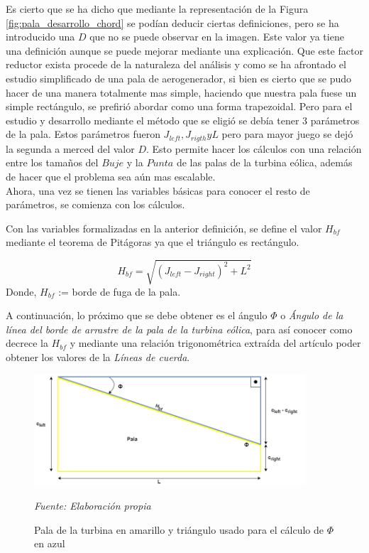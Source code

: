 Es cierto que se ha dicho que mediante la representación de la Figura \ref{fig:pala_desarrollo_chord} se podían deducir ciertas definiciones, pero se ha introducido una $D$ que no se puede observar en la imagen. Este valor ya tiene una definición aunque se puede mejorar mediante una explicación. Que este factor reductor exista procede de la naturaleza del análisis y como se ha afrontado el estudio simplificado de una pala de aerogenerador, si bien es cierto que se pudo hacer de una manera totalmente mas simple, haciendo que nuestra pala fuese un simple rectángulo, se prefirió abordar como una forma trapezoidal. Pero para el estudio y desarrollo mediante el método que se eligió se debía tener 3 parámetros de la pala. Estos parámetros fueron $J_{left}, J_{rigth} y L$ pero para mayor juego se dejó la segunda a merced del valor $D$. Esto permite hacer los cálculos con una relación entre los tamaños del $Buje$ y la $Punta$ de las palas de la turbina eólica, además de hacer que el problema sea aún mas escalable. \\

Ahora, una vez se tienen las variables básicas para conocer el resto de parámetros, se comienza con los cálculos. \\

\begin{definicion}
Con las variables formalizadas en la anterior definición, se define el valor $H_{bf}$ mediante el teorema de Pitágoras ya que el triángulo es rectángulo.

$$ H_{bf} = \sqrt{(J_{left} - J_{right})^{2} + L^{2}}$$
Donde,
\centering
$H_{bf}$ := borde de fuga de la pala.
\label{def_hipotenusa_pala}
\end{definicion}


A continuación, lo próximo que se debe obtener es el ángulo $\Phi$ o \textit{Ángulo de la línea del borde de arrastre de la pala de la turbina eólica}, para así conocer como decrece la $H_{bf}$ y mediante una relación trigonométrica extraída del artículo \cite{armenta2021predictive} poder obtener los valores de la \textit{Líneas de cuerda}.

\begin{figure}[H]
    \centering
    \includegraphics[width=0.9\textwidth]{images/triangulo sacar phi.drawio.png}
    \caption{Pala de la turbina en amarillo y triángulo usado para el cálculo de $\Phi$ en azul}
    \textit{Fuente: Elaboración propia}
    \label{fig:pala_calculo_phi}
\end{figure}

